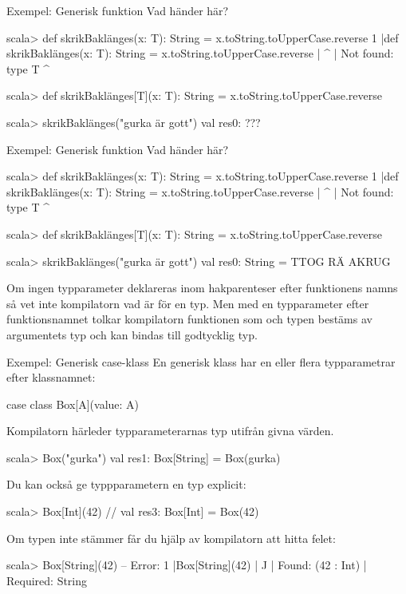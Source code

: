\begin{Slide}{Exempel: Generisk funktion}
Vad händer här?
\begin{REPL}

scala> def skrikBaklänges(x: T): String = x.toString.toUpperCase.reverse
1 |def skrikBaklänges(x: T): String = x.toString.toUpperCase.reverse
  |                      ^
  |                      Not found: type T
                             ^

scala> def skrikBaklänges[T](x: T): String = x.toString.toUpperCase.reverse

scala> skrikBaklänges("gurka är gott")
val res0: ???
\end{REPL}
\end{Slide}
\fi

\begin{Slide}{Exempel: Generisk funktion}
Vad händer här?
\begin{REPL}

scala> def skrikBaklänges(x: T): String = x.toString.toUpperCase.reverse
1 |def skrikBaklänges(x: T): String = x.toString.toUpperCase.reverse
  |                      ^
  |                      Not found: type T
                             ^

scala> def skrikBaklänges[T](x: T): String = x.toString.toUpperCase.reverse

scala> skrikBaklänges("gurka är gott")
val res0: String = TTOG RÄ AKRUG
\end{REPL}
Om ingen typparameter deklareras inom hakparenteser efter funktionens namns så vet inte kompilatorn vad  är för en typ. Men med en typparameter \code{[T]} efter funktionsnamnet tolkar kompilatorn funktionen som  och typen  bestäms av argumentets typ  och  kan bindas till godtycklig typ.
\end{Slide}


\begin{Slide}{Exempel: Generisk case-klass}
\SlideFontSmall
En generisk klass har en eller flera typparametrar efter klassnamnet:
\begin{Code}
case class Box[A](value: A)  
\end{Code}

Kompilatorn härleder typparameterarnas typ utifrån givna värden. 
\begin{REPL}
scala> Box("gurka")  
val res1: Box[String] = Box(gurka)
\end{REPL}

Du kan också ge typpparametern en typ explicit:
\begin{REPL}
scala> Box[Int](42)  // 
val res3: Box[Int] = Box(42)
\end{REPL}

Om typen inte stämmer får du hjälp av kompilatorn att hitta felet:
\begin{REPL}
scala> Box[String](42)
-- Error:
1 |Box[String](42)
  |            ^^
  |            Found:    (42 : Int)
  |            Required: String
\end{REPL}
\end{Slide}






